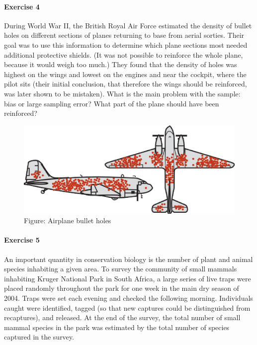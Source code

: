 \documentclass[]{article}
\let\oldparagraph\paragraph
\renewcommand{\paragraph}[1]{\oldparagraph{#1}\mbox{}}
\begin{document}
\hypertarget{exercise-4}{%
\paragraph{Exercise 4}\label{exercise-4}}

During World War II, the British Royal Air Force estimated the density
of bullet holes on different sections of planes returning to base from
aerial sorties. Their goal was to use this information to determine
which plane sections most needed additional protective shields. (It was
not possible to reinforce the whole plane, because it would weigh too
much.) They found that the density of holes was highest on the wings and
lowest on the engines and near the cockpit, where the pilot sits (their
initial conclusion, that therefore the wings should be reinforced, was
later shown to be mistaken). What is the main problem with the sample:
bias or large sampling error? What part of the plane should have been
reinforced?

\begin{figure}
\centering
\includegraphics{AirplaneMissileHits.png}
\caption{Figure: Airplane bullet holes}
\end{figure}

\hypertarget{exercise-5}{%
\paragraph{Exercise 5}\label{exercise-5}}

An important quantity in conservation biology is the number of plant and
animal species inhabiting a given area. To survey the community of small
mammals inhabiting Kruger National Park in South Africa, a large series
of live traps were placed randomly throughout the park for one week in
the main dry season of 2004. Traps were set each evening and checked the
following morning. Individuals caught were identified, tagged (so that
new captures could be distinguished from recaptures), and released. At
the end of the survey, the total number of small mammal species in the
park was estimated by the total number of species captured in the
survey.
\end{document}
